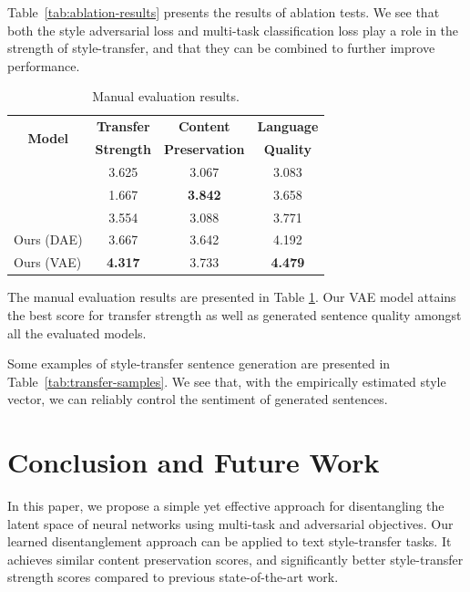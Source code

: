 \documentclass[letterpaper]{article} %
\newcommand{\tabh}[1]{\multicolumn{1}{c|}{\textbf{#1}}}
\newcommand{\tabc}[2]{\multicolumn{1}{|c||}{\multirow{#1}{*}{\textbf{#2}}}}
\begin{document}
Table~\ref{tab:ablation-results} presents the results of ablation tests.
We see that both the style adversarial loss and multi-task classification loss play a role in the strength of style-transfer, and that they can be combined to further improve performance.

\begin{table}[ht]
	\centering
	\begin{tabular}{| l || c | c | c | }
		\hline
		\tabc{2}{Model}                    & \tabh{Transfer} & \tabh{Content}      & \tabh{Language} \\
		                                   & \tabh{Strength} & \tabh{Preservation} & \tabh{Quality}  \\
		\hline
		\hline
		\citeauthor{shen2017style}         & 3.625           & 3.067               & 3.083           \\
		\hline
		\citeauthor{fu2017style}           & 1.667           & \textbf{3.842}      & 3.658           \\
		\hline
		\citeauthor{zhao2018adversarially} & 3.554           & 3.088               & 3.771           \\
		\hline
		Ours (DAE)                         & 3.667           & 3.642               & 4.192           \\
		\hline
		Ours (VAE)                         & \textbf{4.317}  & 3.733               & \textbf{4.479}  \\
		\hline
	\end{tabular}
	\caption{Manual evaluation results.}
	\label{tab:manual-evaluation}
\end{table}

The manual evaluation results are presented in Table \ref{tab:manual-evaluation}.
Our VAE model attains the best score for transfer strength as well as generated sentence quality amongst all the evaluated models.

Some examples of style-transfer sentence generation are presented in Table~\ref{tab:transfer-samples}.
We see that, with the empirically estimated style vector, we can reliably control the sentiment of generated sentences.

\section{Conclusion and Future Work}
In this paper, we propose a simple yet effective approach for disentangling the latent space of neural networks using multi-task and adversarial objectives.
Our learned disentanglement approach can be applied to text style-transfer tasks.
It achieves similar content preservation scores, and significantly better style-transfer strength scores compared to previous state-of-the-art work.
\end{document}
